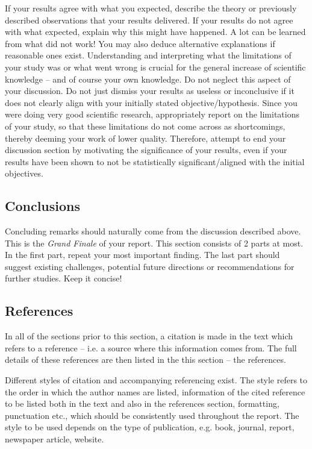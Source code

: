 \documentclass[12pt,a4paper]{article}
\begin{document}
If your results agree with what you expected, describe the theory or
previously described observations that your results delivered. If your results
do not agree with what expected, explain why this might have happened. A lot
can be learned from what did not work! You may also deduce alternative
explanations if reasonable ones exist. Understanding and interpreting what the
limitations of your study was or what went wrong is crucial for the general
increase of scientific knowledge -- and of course your own knowledge. Do not
neglect this aspect of your discussion. Do not just dismiss your results as
useless or inconclusive if it does not clearly align with your initially
stated objective/hypothesis. Since you were doing very good scientific
research, appropriately report on the limitations of your study, so that
these limitations do not come across as shortcomings, thereby deeming your
work of lower quality. Therefore, attempt to end your discussion section by
motivating the significance of your results, even if your results have been
shown to not be statistically significant/aligned with the initial
objectives. 


\subsection{Conclusions}
\label{sec:Conclusions}

Concluding remarks should naturally come from the discussion described
above. This is the \emph{Grand Finale} of your report. This section consists
of 2 parts at most. In the first part, repeat your most important finding. The
last part should suggest existing challenges, potential future directions or
recommendations for further studies. Keep it concise!


\subsection{References}
\label{sec:References}

In all of the sections prior to this section, a citation is made in the text
which refers to a reference -- i.e. a source where this information comes
from. The full details of these references are then listed in the this section
-- the references. 


Different styles of citation and accompanying referencing exist. The style
refers to the order in which the author names are listed, information of the
cited reference to be listed both in the text and also in the references
section, formatting, punctuation etc., which should be consistently used
throughout the report. The style to be used depends on the type of
publication, e.g. book, journal, report, newspaper article, website.
\end{document}

